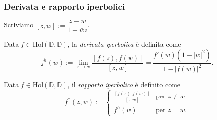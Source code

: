 \begin{frame}
  \frametitle{Derivata e rapporto iperbolici}
  Scriviamo $[z,w]:=\dfrac{z-w}{1-\bar{w}z}$. \pause
  \begin{defn}
    Data $f \in \text{Hol}(\mathbb{D},\mathbb{D})$, la \textit{derivata iperbolica} è definita come
    $$f^h(w):=\lim_{z \longrightarrow w} \frac{[f(z),f(w)]}{[z,w]}=\frac{f'(w)(1-|w|^2)}{1-|f(w)|^2}.$$
  \end{defn}
  \pause
  \begin{defn}
    Data $f \in \text{Hol}(\mathbb{D},\mathbb{D})$, il \textit{rapporto iperbolico} è definito come
    $$f^*(z,w):=\begin{cases}
      \frac{[f(z),f(w)]}{[z,w]} & \mbox{per }z\not=w \\
      f^h(w) & \mbox{per }z=w.
    \end{cases}$$
  \end{defn}
\end{frame}


